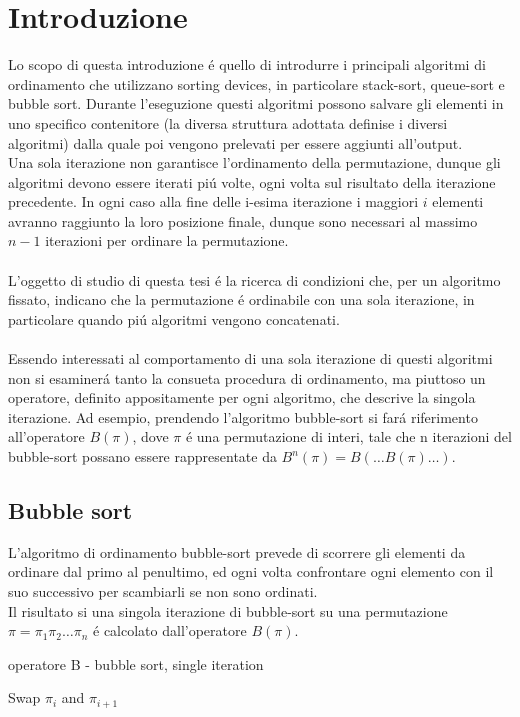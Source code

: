 \chapter{Introduzione}
Lo scopo di questa introduzione \'e quello di introdurre i principali algoritmi di ordinamento che utilizzano sorting devices, in particolare stack-sort,
queue-sort e bubble sort. Durante l'eseguzione questi algoritmi possono 
salvare gli elementi in uno specifico contenitore (la diversa struttura 
adottata definise i diversi algoritmi) dalla quale poi vengono prelevati
per essere aggiunti all'output.\\
Una sola iterazione non garantisce l'ordinamento della permutazione,
dunque gli algoritmi devono essere iterati pi\'u volte, ogni volta sul risultato della iterazione precedente. In ogni caso alla fine delle i-esima
iterazione i maggiori $i$ elementi avranno raggiunto la loro posizione finale, 
dunque sono necessari al massimo $n-1$ iterazioni per ordinare la permutazione.
\\\\L'oggetto di studio di questa tesi \'e la ricerca di condizioni che, per un
algoritmo fissato, indicano che la permutazione \'e ordinabile con una sola
iterazione, in particolare quando pi\'u algoritmi vengono concatenati.
\\\\
Essendo interessati al comportamento di una sola iterazione di questi
algoritmi non si esaminer\'a tanto la consueta procedura di ordinamento,
ma piuttoso un operatore, definito appositamente per ogni algoritmo, che
descrive la singola iterazione. 
Ad esempio, prendendo l'algoritmo bubble-sort si far\'a riferimento all'operatore $B(\pi)$, dove $\pi$ \'e una permutazione di
interi, tale che n iterazioni del bubble-sort possano essere rappresentate
da $B^n(\pi) = B(\dots B(\pi)\dots)$.
\section*{Bubble sort}
L'algoritmo di ordinamento bubble-sort prevede di scorrere gli elementi da 
ordinare dal primo al penultimo, ed ogni volta confrontare ogni elemento 
con il suo successivo per scambiarli se non sono ordinati.\\
Il risultato si una singola iterazione di bubble-sort su una permutazione $\pi=\pi_1\pi_2\dots\pi_n$ \'e calcolato dall'operatore $B(\pi)$.
\begin{algorithm}[H]
   \caption{operatore B - bubble sort, single iteration }
\begin{algorithmic}
   \State Swap $\pi_i$ and $\pi_{i+1}$
   \EndIf
   \EndFor
\end{algorithmic}
\end{algorithm}
